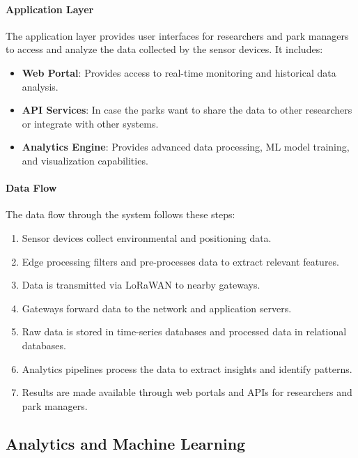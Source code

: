 \paragraph{Application Layer}
The application layer provides user interfaces for researchers and park managers to access and analyze the data collected by the sensor devices. It includes:

\begin{itemize}
  \item \textbf{Web Portal}: Provides access to real-time monitoring and historical data analysis.
  \item \textbf{API Services}: In case the parks want to share the data to other researchers or integrate with other systems.
  \item \textbf{Analytics Engine}: Provides advanced data processing, ML model training, and visualization capabilities. %
\end{itemize}

\paragraph{Data Flow}
The data flow through the system follows these steps:
\begin{enumerate}
  \item Sensor devices collect environmental and positioning data.
  \item Edge processing filters and pre-processes data to extract relevant features. %
  \item Data is transmitted via LoRaWAN to nearby gateways.
  \item Gateways forward data to the network and application servers.
  \item Raw data is stored in time-series databases and processed data in relational databases.
  \item Analytics pipelines process the data to extract insights and identify patterns.
  \item Results are made available through web portals and APIs for researchers and park managers.
\end{enumerate}

\subsection{Analytics and Machine Learning}

